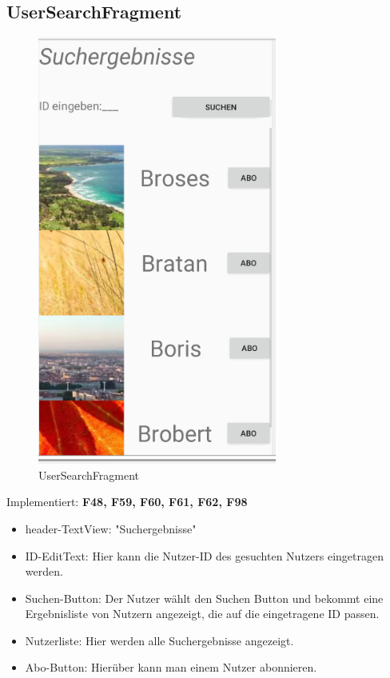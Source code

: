 \subsection{UserSearchFragment}
\begin{figure}[H]
	\centering
	\includegraphics[width=0.7\textwidth]{pics/user_search_fragment.png}%
	\caption{UserSearchFragment}%
	\label{view}%
\end{figure}
Implementiert: \textbf{F48, F59, F60, F61, F62, F98}
\begin{itemize}[nosep]
	\item  header-TextView: "Suchergebnisse"
	\item 	ID-EditText: Hier kann die Nutzer-ID des gesuchten Nutzers eingetragen werden.
	\item Suchen-Button: Der Nutzer wählt den Suchen Button und bekommt eine Ergebnisliste von Nutzern angezeigt, die auf die eingetragene ID passen.
	\item Nutzerliste: Hier werden alle Suchergebnisse angezeigt.
	\item Abo-Button: Hierüber kann man einem Nutzer abonnieren.
\end{itemize}



